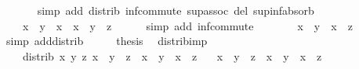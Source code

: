 \begin{isabellebody}
\ \ \ \ \isamarkupfalse%
\ {\isacharparenleft}{\kern0pt}simp\ add{\isacharcolon}{\kern0pt}\ distrib\ inf{\isacharunderscore}{\kern0pt}commute\ sup{\isacharunderscore}{\kern0pt}assoc\ del{\isacharcolon}{\kern0pt}\ sup{\isacharunderscore}{\kern0pt}inf{\isacharunderscore}{\kern0pt}absorb{\isacharparenright}{\kern0pt}\isanewline
\ \ \isamarkupfalse%
\ \isamarkupfalse%
\ {\isachardoublequoteopen}{\isasymdots}\ {\isacharequal}{\kern0pt}\ {\isacharparenleft}{\kern0pt}{\isacharparenleft}{\kern0pt}x\ {\isasymsqunion}\ y{\isacharparenright}{\kern0pt}\ {\isasymsqinter}\ x{\isacharparenright}{\kern0pt}\ {\isasymsqunion}\ {\isacharparenleft}{\kern0pt}{\isacharparenleft}{\kern0pt}x\ {\isasymsqunion}\ y{\isacharparenright}{\kern0pt}\ {\isasymsqinter}\ z{\isacharparenright}{\kern0pt}{\isachardoublequoteclose}\isanewline
\ \ \ \ \isamarkupfalse%
\ {\isacharparenleft}{\kern0pt}simp\ add{\isacharcolon}{\kern0pt}\ inf{\isacharunderscore}{\kern0pt}commute{\isacharparenright}{\kern0pt}\isanewline
\ \ \isamarkupfalse%
\ \isamarkupfalse%
\ {\isachardoublequoteopen}{\isasymdots}\ {\isacharequal}{\kern0pt}\ {\isacharparenleft}{\kern0pt}x\ {\isasymsqunion}\ y{\isacharparenright}{\kern0pt}\ {\isasymsqinter}\ {\isacharparenleft}{\kern0pt}x\ {\isasymsqunion}\ z{\isacharparenright}{\kern0pt}{\isachardoublequoteclose}\ \isamarkupfalse%
{\isacharparenleft}{\kern0pt}simp\ add{\isacharcolon}{\kern0pt}distrib{\isacharparenright}{\kern0pt}\isanewline
\ \ \isamarkupfalse%
\ \isamarkupfalse%
\ {\isacharquery}{\kern0pt}thesis\ \isacommand{{\isachardot}{\kern0pt}}\isamarkupfalse%
\isanewline
{}\isamarkupfalse%
%
\endisatagproof
{\isafoldproof}%
%
\isadelimproof
\isanewline
%
\endisadelimproof
\isanewline
{}\isamarkupfalse%
\ distrib{\isacharunderscore}{\kern0pt}imp{}{\isacharcolon}{\kern0pt}\isanewline
\ \ \ distrib{\isacharcolon}{\kern0pt}\ {\isachardoublequoteopen}{\isasymAnd}x\ y\ z{\isachardot}{\kern0pt}\ x\ {\isasymsqunion}\ {\isacharparenleft}{\kern0pt}y\ {\isasymsqinter}\ z{\isacharparenright}{\kern0pt}\ {\isacharequal}{\kern0pt}\ {\isacharparenleft}{\kern0pt}x\ {\isasymsqunion}\ y{\isacharparenright}{\kern0pt}\ {\isasymsqinter}\ {\isacharparenleft}{\kern0pt}x\ {\isasymsqunion}\ z{\isacharparenright}{\kern0pt}{\isachardoublequoteclose}\isanewline
\ \ \ {\isachardoublequoteopen}x\ {\isasymsqinter}\ {\isacharparenleft}{\kern0pt}y\ {\isasymsqunion}\ z{\isacharparenright}{\kern0pt}\ {\isacharequal}{\kern0pt}\ {\isacharparenleft}{\kern0pt}x\ {\isasymsqinter}\ y{\isacharparenright}{\kern0pt}\ {\isasymsqunion}\ {\isacharparenleft}{\kern0pt}x\ {\isasymsqinter}\ z{\isacharparenright}{\kern0pt}{\isachardoublequoteclose}\isanewline

\end{isabellebody}
